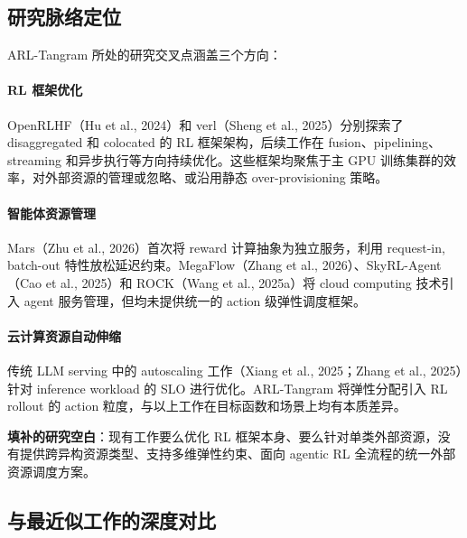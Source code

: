 \documentclass[11pt, a4paper]{article}
\begin{document}
\subsection{研究脉络定位}

ARL-Tangram 所处的研究交叉点涵盖三个方向：

\paragraph{RL 框架优化}
OpenRLHF（Hu et al., 2024）和 verl（Sheng et al., 2025）分别探索了 disaggregated 和 colocated 的 RL 框架架构，后续工作在 fusion、pipelining、streaming 和异步执行等方向持续优化。这些框架均聚焦于主 GPU 训练集群的效率，对外部资源的管理或忽略、或沿用静态 over-provisioning 策略。

\paragraph{智能体资源管理}
Mars（Zhu et al., 2026）首次将 reward 计算抽象为独立服务，利用 request-in, batch-out 特性放松延迟约束。MegaFlow（Zhang et al., 2026）、SkyRL-Agent（Cao et al., 2025）和 ROCK（Wang et al., 2025a）将 cloud computing 技术引入 agent 服务管理，但均未提供统一的 action 级弹性调度框架。

\paragraph{云计算资源自动伸缩}
传统 LLM serving 中的 autoscaling 工作（Xiang et al., 2025；Zhang et al., 2025）针对 inference workload 的 SLO 进行优化。ARL-Tangram 将弹性分配引入 RL rollout 的 action 粒度，与以上工作在目标函数和场景上均有本质差异。

\textbf{填补的研究空白}：现有工作要么优化 RL 框架本身、要么针对单类外部资源，没有提供跨异构资源类型、支持多维弹性约束、面向 agentic RL 全流程的统一外部资源调度方案。

\subsection{与最近似工作的深度对比}
\end{document}
